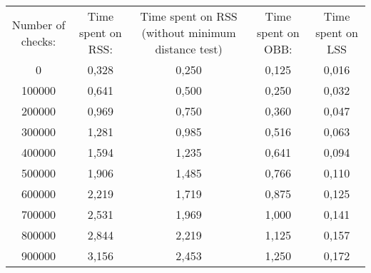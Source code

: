 \begin{tabular}{c|c|c|c|c}\\ 
Number of checks: & Time spent on RSS: & Time spent on RSS (without minimum distance test) & Time spent on OBB: & Time spent on LSS\\ 
0 & 0,328 & 0,250 & 0,125 & 0,016\\ 
100000 & 0,641 & 0,500 & 0,250 & 0,032\\ 
200000 & 0,969 & 0,750 & 0,360 & 0,047\\ 
300000 & 1,281 & 0,985 & 0,516 & 0,063\\ 
400000 & 1,594 & 1,235 & 0,641 & 0,094\\ 
500000 & 1,906 & 1,485 & 0,766 & 0,110\\ 
600000 & 2,219 & 1,719 & 0,875 & 0,125\\ 
700000 & 2,531 & 1,969 & 1,000 & 0,141\\ 
800000 & 2,844 & 2,219 & 1,125 & 0,157\\ 
900000 & 3,156 & 2,453 & 1,250 & 0,172\\ 
\end{tabular}